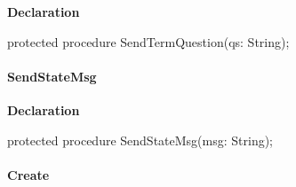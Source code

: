 \documentclass{report}
\newif\ifpdf
\begin{document}
\label{ipkhandle.TInstallation-SendTermQuestion}
\begin{list}{}{
\setlength{\itemindent}{0cm}
\setlength{\listparindent}{0cm}
\setlength{\leftmargin}{\evensidemargin}
\addtolength{\leftmargin}{\tmplength}
\settowidth{\labelsep}{X}
\addtolength{\leftmargin}{\labelsep}
\setlength{\labelwidth}{\tmplength}
}
\item[\textbf{Declaration}\hfill]
\ifpdf
\begin{flushleft}
\fi
\begin{ttfamily}
protected procedure SendTermQuestion(qs: String);\end{ttfamily}

\ifpdf
\end{flushleft}
\fi

\end{list}
\paragraph*{SendStateMsg}\hspace*{\fill}

\label{ipkhandle.TInstallation-SendStateMsg}
\begin{list}{}{
\setlength{\itemindent}{0cm}
\setlength{\listparindent}{0cm}
\setlength{\leftmargin}{\evensidemargin}
\addtolength{\leftmargin}{\tmplength}
\settowidth{\labelsep}{X}
\addtolength{\leftmargin}{\labelsep}
\setlength{\labelwidth}{\tmplength}
}
\item[\textbf{Declaration}\hfill]
\ifpdf
\begin{flushleft}
\fi
\begin{ttfamily}
protected procedure SendStateMsg(msg: String);\end{ttfamily}

\ifpdf
\end{flushleft}
\fi

\end{list}
\paragraph*{Create}\hspace*{\fill}
\end{document}
